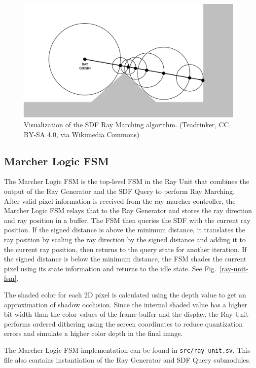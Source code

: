 \documentclass[conference]{IEEEtran}
\begin{document}
\begin{figure}[htbp]
\centerline{\includegraphics[scale=0.1]{ray-march-viz.png}}
\caption{Visualization of the SDF Ray Marching algorithm. (Teadrinker, CC BY-SA 4.0, via Wikimedia Commons)}
\label{ray-march-viz}
\end{figure}

\subsection{Marcher Logic FSM}

The Marcher Logic FSM is the top-level FSM in the Ray Unit that combines the output of the Ray Generator and the SDF Query to perform Ray Marching. After valid pixel information is received from the ray marcher controller, the Marcher Logic FSM relays that to the Ray Generator and stores the ray direction and ray position in a buffer. The FSM then queries the SDF with the current ray position. If the signed distance is above the minimum distance, it translates the ray position by scaling the ray direction by the signed distance and adding it to the current ray position, then returns to the query state for another iteration. If the signed distance is below the minimum distance, the FSM shades the current pixel using its state information and returns to the idle state. See Fig.~\ref{ray-unit-fsm}.

The shaded color for each 2D pixel is calculated using the depth value to get an approximation of shadow occlusion. Since the internal shaded value has a higher bit width than the color values of the frame buffer and the display, the Ray Unit performs ordered dithering using the screen coordinates to reduce quantization errors and simulate a higher color depth in the final image.

The Marcher Logic FSM implementation can be found in \texttt{src/ray\_unit.sv}. This file also contains instantiation of the Ray Generator and SDF Query submodules.
\end{document}
